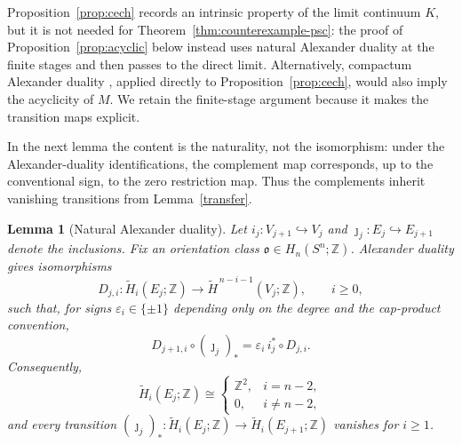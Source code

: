 \documentclass[12pt,oneside,a4paper]{article}
\theoremstyle{mytheorem}
\newtheorem{lemma}[definition]{Lemma}
\theoremstyle{remark}
\theoremstyle{definition}
\begin{document}
Proposition~\ref{prop:cech} records an intrinsic property of the limit
continuum $K$, but it is not needed for Theorem~\ref{thm:counterexample-psc}: the proof of
Proposition~\ref{prop:acyclic} below instead uses natural Alexander
duality at the finite stages and then passes to the direct limit.
Alternatively, compactum Alexander duality
\cite[pp.~255--257]{zbMATH02103273}, applied directly to
Proposition~\ref{prop:cech}, would also imply the acyclicity of $M$.  We
retain the finite-stage argument because it makes the transition maps
explicit.







In the next lemma the content is the naturality, not the isomorphism:
under the Alexander-duality identifications, the complement map
corresponds, up to the conventional sign, to the zero restriction map.
Thus the complements inherit vanishing transitions from
Lemma~\ref{transfer}.





\begin{lemma}[Natural Alexander duality]\label{duality}
Let
\(i_j:V_{j+1}\hookrightarrow V_j\)
and
\(\jmath_j:E_j\hookrightarrow E_{j+1}\)
denote the inclusions.  Fix an orientation class
$\mathfrak o\in H_n(S^n;\mathbb Z)$.  Alexander duality gives isomorphisms
\[
D_{j,i}:
\widetilde H_i(E_j;\mathbb Z)
\longrightarrow
\widetilde H^{\,n-i-1}(V_j;\mathbb Z),
\qquad i\geq0,
\]
such that, for signs $\varepsilon_i\in\{\pm1\}$ depending only on the
degree and the cap-product convention,
\[
D_{j+1,i}\circ(\jmath_j)_*
=
\varepsilon_i\,i_j^*\circ D_{j,i}.
\]
Consequently,
\begin{equation}\label{Ej-homology}
\widetilde H_i(E_j;\mathbb Z)\cong
\begin{cases}
\mathbb Z^2,&i=n-2,\\
0,&i\neq n-2,
\end{cases}
\end{equation}
and every transition
$(\jmath_j)_*:
\widetilde H_i(E_j;\mathbb Z)\to\widetilde H_i(E_{j+1};\mathbb Z)$
vanishes for $i\geq1$.
\end{lemma}
\end{document}
